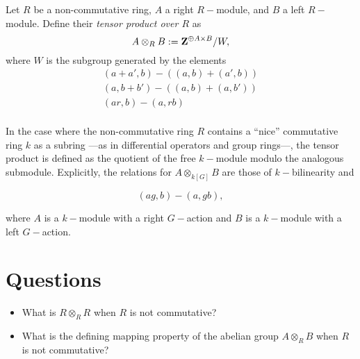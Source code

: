 \documentclass{amsart}
\begin{document}
\begin{defn}
	Let $R$ be a non-commutative ring, $A$ a right $R-$module, and $B$ a left $R-$module.
	Define their \emph{tensor product over $R$} as
	$$
	A \otimes_R B := \mathbf{Z}^{\oplus A \times B}/W,
	$$
	where $W$ is the subgroup generated by the elements
	\begin{eqnarray*}
		(a+a', b) - \left( (a, b) + (a', b) \right) \\
		(a, b+b') - \left( (a, b) + (a, b') \right) \\
		(ar, b) - (a, rb) \\
	\end{eqnarray*}
\end{defn}

In the case where the non-commutative ring $R$ contains a ``nice'' commutative ring $k$ as a
subring ---as in differential operators and group rings---, the tensor product is defined as the
quotient of the free $k-$module modulo the analogous submodule. Explicitly, the relations for
$A \otimes_{k[G]} B$ are those of $k-$bilinearity and

$$
(ag, b) - (a, gb),
$$

where $A$ is a $k-$module with a right $G-$action and $B$ is a $k-$module with a left $G-$action.

\section{Questions}

\begin{itemize}
	\item What is $R \otimes_R R$ when $R$ is not commutative?
	\item What is the defining mapping property of the abelian group $A \otimes_R B$ when $R$
		is not commutative?
\end{itemize}
\end{document}
